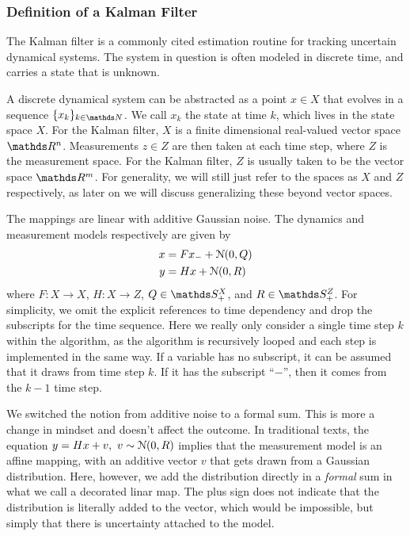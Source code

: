 \subsubsection{Definition of a Kalman Filter}

The Kalman filter is a commonly cited estimation routine for tracking uncertain dynamical systems.
The system in question is often modeled in discrete time, and carries a state that is unknown. 

A discrete dynamical system can be abstracted as a point $x\in X$ that evolves in a sequence $\{x_k\}_{k\in \naturals}$.
We call $x_k$ the state at time $k$, which lives in the state space $X$. For the Kalman filter, $X$ is a finite dimensional real-valued vector space $\reals^n$.
Measurements $z\in Z$ are then taken at each time step, where $Z$ is the measurement space. For the Kalman filter, $Z$ is usually taken to be the vector space $\reals^m$. For generality, we will still just refer to the spaces as $X$ and $Z$ respectively, as later on we will discuss generalizing these beyond vector spaces.

The mappings are linear with additive Gaussian noise. The dynamics and measurement models respectively are given by
\begin{equation}
	\label{kalman-filter-models}
	\begin{aligned}
		x &= Fx_- + \mathcal{N}(0,Q)\\
		y &= Hx + \mathcal{N}(0,R)
	\end{aligned}
\end{equation}
where $F:X\rightarrow X$, $H:X\rightarrow Z$, $Q\in \symmetric^X_+$, and $R\in\symmetric^Z_+$.
For simplicity, we omit the explicit references to time dependency and drop the subscripts for the time sequence.
Here we really only consider a single time step $k$ within the algorithm, as the algorithm is recursively looped and each step is implemented in the same way. If a variable has no subscript, it can be assumed that it draws from time step $k$. If it has the subscript ``$-$'', then it comes from the $k-1$ time step.

We switched the notion from additive noise to a formal sum. This is more a change in mindset and doesn't affect the outcome. In traditional texts, the equation $y = Hx + v,\ v\sim \mathcal{N}(0,R)$ implies that the measurement model is an affine mapping, with an additive vector $v$ that gets drawn from a Gaussian distribution. Here, however, we add the distribution directly in a \emph{formal} sum in what we call a decorated linar map\cite{extended-gaussian}. The plus sign does not indicate that the distribution is literally added to the vector, which would be impossible, but simply that there is uncertainty attached to the model. 

